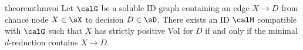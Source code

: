 








\begin{restatable}{theorem}{thmvoi} \label{thm:voi}
Let $\calG$ be a soluble ID graph containing an edge $X \to D$ from
chance node $X \in \sX$ to decision $D \in \sD$.
There exists an ID $\calM$ compatible with $\calG$ such that $X$ has strictly positive VoI for $D$ if and only if 
the minimal $d$-reduction contains $X \to D$.
\end{restatable}

